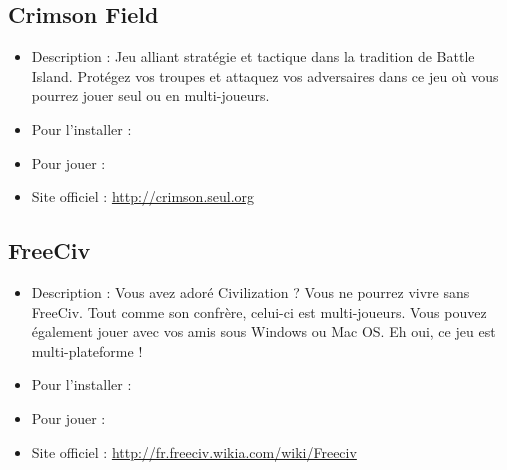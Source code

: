 \subsection{Crimson Field}
\begin{itemize}
\begingroup
{}
\item Description : Jeu alliant stratégie et tactique dans la tradition de Battle Island. Protégez vos troupes et attaquez vos adversaires dans ce jeu où vous pourrez jouer seul ou en multi-joueurs.{\par}
\item Pour l'installer : 
\item Pour jouer : 
\item Site officiel : \url{http://crimson.seul.org}{\par}
\endgroup
\end{itemize}
\subsection{FreeCiv}
\begin{itemize}
\begingroup
{}
\item Description : Vous avez adoré Civilization ? Vous ne pourrez vivre sans FreeCiv. Tout comme son confrère, celui-ci est multi-joueurs. Vous pouvez également jouer avec vos amis sous Windows ou Mac OS. Eh oui, ce jeu est multi-plateforme !{\par}
\item Pour l'installer : 
\item Pour jouer : 
\item Site officiel : \url{http://fr.freeciv.wikia.com/wiki/Freeciv}{\par}
\endgroup
\end{itemize}
